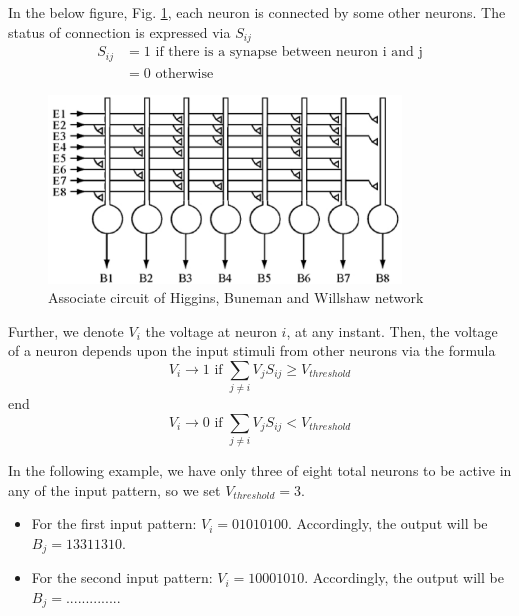 In the below figure, Fig. \ref{fig:HBW_network}, each neuron is
connected by some other neurons. The status of connection is expressed
via $S_{ij}$ 
\begin{equation}\begin{split}
  S_{ij} &= 1 \text{   if there is a synapse between neuron i and j} \\
         &= 0 \text{   otherwise}
\end{split}
\end{equation}
\begin{figure}[htb]
  \centerline{\includegraphics[height=5cm]{./images/HBW_network.eps}}
  \caption{Associate circuit of Higgins, Buneman and Willshaw network}\label{fig:HBW_network}
\end{figure}


Further, we denote $V_i$ the voltage at neuron $i$, at any
instant. Then, the voltage of a neuron depends upon the input stimuli
from other neurons via the formula
\begin{equation}
  V_i \rightarrow 1 \text{ if } \sum_{j\ne i} V_j S_{ij} \ge V_{threshold}
\end{equation}
end
\begin{equation}
  V_i \rightarrow 0 \text{ if } \sum_{j\ne i} V_j S_{ij} < V_{threshold}
\end{equation}

In the following example, we have only three of eight total neurons to be
active in any of the input pattern, so we set $V_{threshold} = 3$. 
\begin{itemize}
\item For the first input pattern: $V_i = {0 1 0 1 0 1 0 0
  }$. Accordingly, the output will be $B_j = {1 3 3 1 1 3 1 0}$. 
\item For the second input pattern: $V_i = {1 0 0 0 1 0 1 0
  }$. Accordingly, the output will be $B_j = {.............}$. 
\end{itemize}

